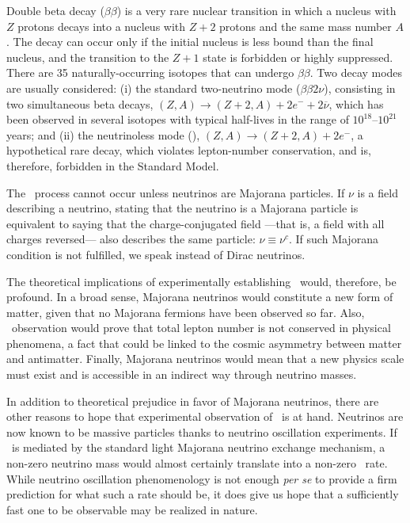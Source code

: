Double beta decay ($\beta\beta$) is a very rare nuclear transition in which a nucleus with $Z$ protons decays into a nucleus with $Z + 2$ protons and the same mass number $A$. The decay can occur only if the initial nucleus is less bound than the final nucleus, and the transition to the $Z+1$ state is forbidden or highly suppressed. There are 35 naturally-occurring isotopes that can undergo $\beta\beta$. Two decay modes are usually considered: (i) the standard two-neutrino mode ($\beta\beta2\nu$), consisting in two simultaneous beta decays, $(Z,A) \rightarrow (Z + 2,A) + 2 e^- +2\overline{\nu}$, which has been observed in several isotopes with typical half-lives in the range of $10^{18}$--$10^{21}$ years; and (ii) the neutrinoless mode (\bbonu), $(Z,A) \rightarrow (Z +2, A) + 2 e^-$, a hypothetical rare decay, which violates lepton-number conservation, and is, therefore, forbidden in the Standard Model.

The \bbonu\ process cannot occur unless neutrinos are Majorana particles. If $\nu$ is a field describing a neutrino, stating that the neutrino is a Majorana particle is equivalent to saying that the charge-conjugated field ---\thinspace that is, a field with all charges reversed\thinspace--- also describes the same particle: $\nu\equiv\nu^c$. If such Majorana condition is not fulfilled, we speak instead of Dirac neutrinos. 

The theoretical implications of experimentally establishing \bbonu\ would, therefore, be profound. In a broad sense, Majorana neutrinos would constitute a new form of matter, given that no Majorana fermions have been observed so far. Also, \bbonu\ observation would prove that total lepton number is not conserved in physical phenomena, a fact that could be linked to the cosmic asymmetry between matter and antimatter. Finally, Majorana neutrinos would mean that a new physics scale must exist and is accessible in an indirect way through neutrino masses. 

In addition to theoretical prejudice in favor of Majorana neutrinos, there are other reasons to hope that experimental observation of \bbonu\ is at hand. Neutrinos are now known to be massive particles thanks to neutrino oscillation experiments. If \bbonu\ is mediated by the standard light Majorana neutrino exchange mechanism, a non-zero neutrino mass would almost certainly translate into a non-zero \bbonu\ rate. While neutrino oscillation phenomenology is not enough \emph{per se} to provide a firm prediction for what such a rate should be, it does give us hope that a sufficiently fast one to be observable may be realized in nature. 

